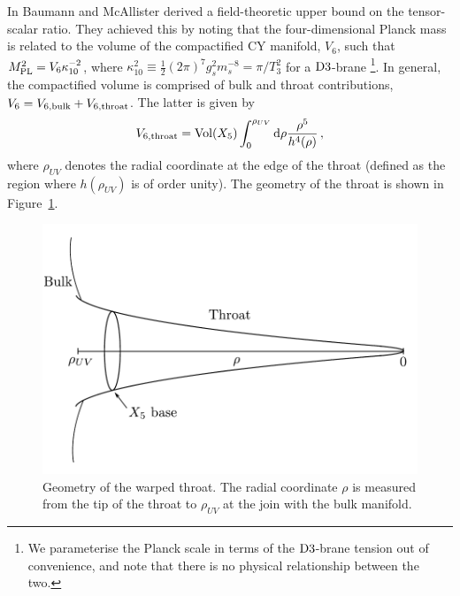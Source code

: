 In  Baumann and McAllister
derived a field-theoretic upper bound on the tensor-scalar ratio. They achieved
this by noting that the four-dimensional Planck mass is related 
to the volume of the compactified CY manifold, $V_6$, such that 
$M_{\mathrm{PL}}^2=V_6 \kappa_{10}^{-2}$, where $\kappa_{10}^2 \equiv 
\frac{1}{2} (2\pi )^7 g_s^2 m_s^{-8} = \pi /T_3^{2}$ for a 
${\rm D3}$-brane \footnote{We parameterise the Planck scale 
in terms of the ${\rm D3}$-brane tension out of convenience, 
and note that there is no physical relationship between the two.}.
In general, the compactified volume 
is comprised of bulk and throat contributions, 
$V_6 = V_{6,{\rm bulk}}+V_{6,{\rm throat}}$. The latter is 
given by
% 
\begin{equation}
\label{eq:throatvolume}
V_{6,\mathrm{throat}} = \mathrm{Vol}(X_5)  
\int_0^{\rho_{UV}} \mathrm{d}\rho \frac{\rho^5}{h^4(\rho )} \,,
\end{equation}
% 
where $\rho_{UV}$ denotes the radial coordinate at 
the edge of the throat (defined as the region 
where $h (\rho_{UV})$ is of order unity). The geometry of the throat is shown
in Figure~\ref{fig:throat-geom}.

% 
\begin{figure}
 \centering
 \includegraphics[width=\textwidth]{./dbi/graphs/throat-geom.pdf}
 \caption[Warped Throat Geometry]{Geometry of the warped throat. The radial
coordinate $\rho$ is measured from the tip of the throat to $\rho_{UV}$ at the join
with the bulk manifold.}
 \label{fig:throat-geom}
\end{figure}

% 


